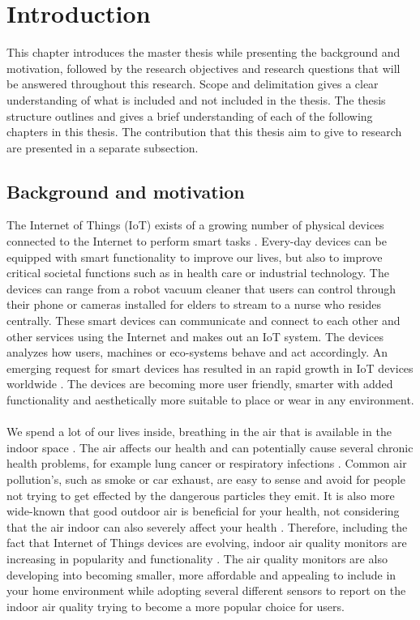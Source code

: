\chapter{Introduction}
This chapter introduces the master thesis while presenting the background and motivation, followed by the research objectives and research questions that will be answered throughout this research. Scope and delimitation gives a clear understanding of what is included and not included in the thesis. The thesis structure outlines and gives a brief understanding of each of the following chapters in this thesis. The contribution that this thesis aim to give to research are presented in a separate subsection. 

\section{Background and motivation}
The Internet of Things (IoT) exists of a growing number of physical devices connected to the Internet to perform smart tasks \cite{IoTSurveyAl-Fuqaha}. Every-day devices can be equipped with smart functionality to improve our lives, but also to improve critical societal functions such as in health care or industrial technology. The devices can range from a robot vacuum cleaner that users can control through their phone or cameras installed for elders to stream to a nurse who resides centrally. These smart devices can communicate and connect to each other and other services using the Internet and makes out an IoT system. The devices analyzes how users, machines or eco-systems behave and act accordingly. An emerging request for smart devices has resulted in an rapid growth in IoT devices worldwide \cite{IoTAndPrivacy}. The devices are becoming more user friendly, smarter with added functionality and aesthetically more suitable to place or wear in any environment. 
\\\\
We spend a lot of our lives inside, breathing in the air that is available in the indoor space \cite{IndoorAirQualityMonitorIoT}. The air affects our health and can potentially cause several chronic health problems, for example lung cancer or respiratory infections \cite{IAQMonitorReview}. Common air pollution's, such as smoke or car exhaust, are easy to sense and avoid for people not trying to get effected by the dangerous particles they emit. It is also more wide-known that good outdoor air is beneficial for your health, not considering that the air indoor can also severely affect your health \cite{IndoorAirQuality}. Therefore, including the fact that Internet of Things devices are evolving, indoor air quality monitors are increasing in popularity and functionality \cite{SecurityAndDataIntInAQM}. The air quality monitors are also developing into becoming smaller, more affordable and appealing to include in your home environment while adopting several different sensors to report on the indoor air quality trying to become a more popular choice for users. 
